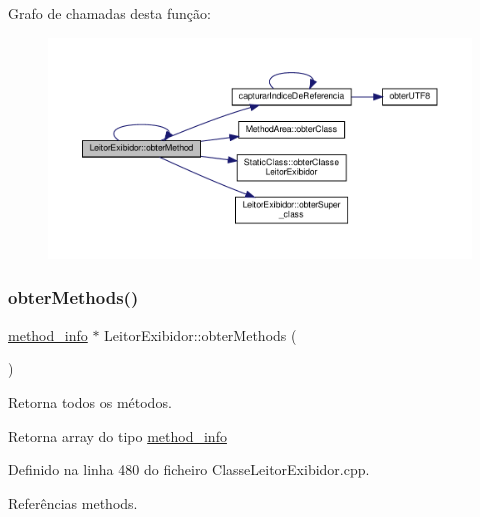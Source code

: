 Grafo de chamadas desta função\+:
\nopagebreak
\begin{figure}[H]
\begin{center}
\leavevmode
\includegraphics[width=350pt]{classLeitorExibidor_a4d1a48fa9825d2cb2b520be79112408c_cgraph}
\end{center}
\end{figure}
\mbox{\label{classLeitorExibidor_a0fbc8db7d08d00ec8f12e26bbce93048}} 
\subsubsection{\texorpdfstring{obter\+Methods()}{obterMethods()}}
{\footnotesize\ttfamily \hyperlink{structmethod__info}{method\+\_\+info} $\ast$ Leitor\+Exibidor\+::obter\+Methods (\begin{DoxyParamCaption}{ }\end{DoxyParamCaption})}



Retorna todos os métodos. 

\begin{DoxyReturn}{Retorna}
array do tipo \hyperlink{structmethod__info}{method\+\_\+info} 
\end{DoxyReturn}


Definido na linha 480 do ficheiro Classe\+Leitor\+Exibidor.\+cpp.



Referências methods.

\mbox{\label{classLeitorExibidor_aa9c91f4a145f4ef753c33f8898075930}} 
